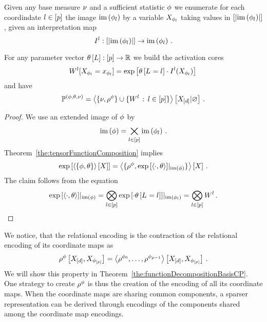 \begin{theorem}\label{def:expFamilyTensorRep}
	Given any base measure $\nu$ and a sufficient statistic $\phi$ we enumerate for each coordindate $l\in[p]$ the image $\mathrm{im}\left(\phi_{l}\right)$ by a variable $X_{\phi_{l}}$ taking values in $[\left|\mathrm{im}\left(\phi_{l}\right)\right|]$, given an interpretation map
		\[ I^{l} : 
		[\left|\mathrm{im}\left(\phi_{l}\right)\right|] \rightarrow \mathrm{im}\left(\phi_{l}\right) \, . \]
	
	For any parameter vector $\theta\left[L\right]:[p]\rightarrow\mathbb{R}$ we build the activation cores
		\[ W^{l}[X_{\phi_{l}}=x_{\phi_{l}}] 
		= \mathrm{exp}\left[\theta\left[L_{}=l_{}\right] \cdot I^{l}(X_{\phi_{l}}) \right] \,   \]
	and have
		\[ \mathbb{P}^{(\phi,\theta,\nu)} = 
		\left\langle \{\nu,\rho^{\phi}\}\cup\{W^{l} \, : \, l\in[p]\}\right\rangle \left[ X_{[d]} | \varnothing \right] \, . 
		\]
\end{theorem}
\begin{proof}
	We use an extended image of $\phi$ by  %
		\[ \mathrm{im}\left(\phi\right) = \bigtimes_{l\in[p]} \mathrm{im}\left(\phi_{l}\right) \, . \]
	Theorem~\ref{the:tensorFunctionComposition} implies
		\[ \mathrm{exp}\left[\left\langle \{\phi, \theta\}\right\rangle \left[ X \right]\right]
		= \left\langle \{\rho^{\phi}, {\mathrm{exp}\left[\braket{\cdot, \theta}\right]}|_{\mathrm{im}\left(\phi\right)} \}\right\rangle \left[ X \right] \, . \]
	The claim follows from the equation
		\[ {\mathrm{exp}\left[\braket{\cdot, \theta}\right]}|_{\mathrm{im}\left(\phi\right)} 
		= \bigotimes_{l\in[p]} {\mathrm{exp}\left[\cdot \theta\left[L_{}=l_{}\right]\right]}|_{\mathrm{im}\left(\phi_{l}\right)}  
		= \bigotimes_{l\in[p]} W^{l} \, . \]
\end{proof}


We notice, that the relational encoding is the contraction of the relational encoding of its coordinate maps as 
	\[ \rho^{\phi}\left[X_{[d]},X_{\phi_{[p]}}\right] = \left\langle \rho^{\phi_{0}},\ldots,\rho^{\phi_{p-1}}\right\rangle \left[ X_{[d]},X_{\phi_{[p]}} \right] \, .  \]
We will show this property in Theorem~\ref{the:functionDecompositionBasisCP}.
One strategy to create $\rho^{\phi}$ is thus the creation of the encoding of all its coordinate maps.
When the coordinate maps are sharing common components, a sparser representation can be derived through encodings of the components shared among the coordinate map encodings.


